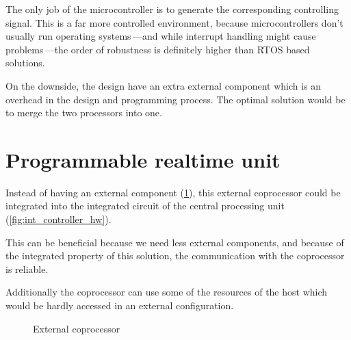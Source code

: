 The only job of the microcontroller is to generate the corresponding controlling signal. This is a far more controlled environment, because microcontrollers don't usually run operating systems\,---and while interrupt handling might cause problems\,---the order of robustness is definitely higher than RTOS based solutions.

On the downside, the design have an extra external component which is an overhead in the design and programming process. The optimal solution would be to merge the two processors into one.

\section{Programmable realtime unit}

Instead of having an external component (\cref{fig:ext_controller_hw}), this external coprocessor could be integrated into the integrated circuit of the central processing unit (\cref{fig:int_controller_hw}).

This can be beneficial because we need less external components, and because of the integrated property of this solution, the communication with the coprocessor is reliable.

Additionally the coprocessor can use some of the resources of the host \cpu which would be hardly accessed in an external configuration.

\begin{figure}[h]
	\centering
	\caption{External coprocessor}
	\label{fig:ext_controller_hw}
\end{figure}


